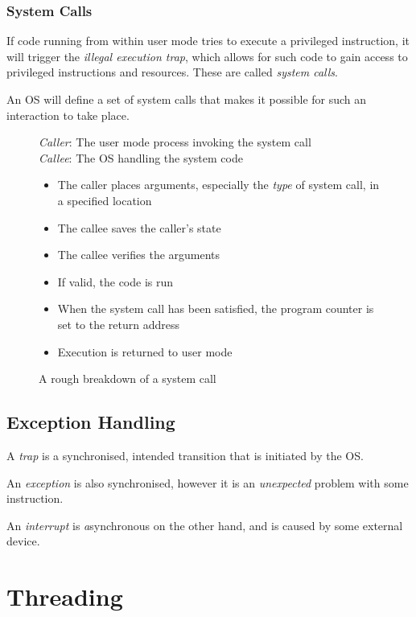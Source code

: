 \documentclass{article}
\begin{document}
\subsubsection{System Calls}

If code running from within user mode tries to execute a privileged instruction, it will trigger the \textit{illegal execution trap}, which allows for such code to gain access to privileged instructions and resources. These are called \textit{system calls}.

An OS will define a set of system calls that makes it possible for such an interaction to take place.

\begin{figure}[H]
  \begin{framed}
    \textit{Caller}: The user mode process invoking the system call\\
    \textit{Callee}: The OS handling the system code\\
    \begin{itemize}
    \item The caller places arguments, especially the \textit{type} of system call, in a specified location
    \item The callee saves the caller's state
    \item The callee verifies the arguments
    \item If valid, the code is run
    \item When the system call has been satisfied, the program counter is set to the return address
    \item Execution is returned to user mode
    \end{itemize}
  \end{framed}
  \caption{A rough breakdown of a system call}
\end{figure}

\subsection{Exception Handling}

A \textit{trap} is a synchronised, intended transition that is initiated by the OS.

An \textit{exception} is also synchronised, however it is an \textit{unexpected} problem with some instruction.

An \textit{interrupt} is \textit{a}synchronous on the other hand, and is caused by some external device.


\filbreak
\section{Threading}
\end{document}
